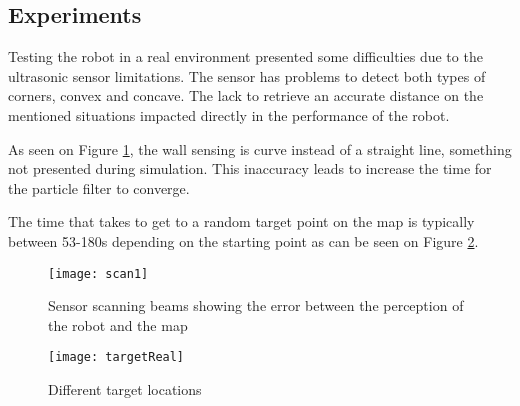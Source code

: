 \subsection{Experiments}

Testing the robot in a real environment presented some difficulties due to the  ultrasonic sensor limitations. The sensor has problems to detect both types of corners, convex and concave. The lack to retrieve an accurate distance on the mentioned situations impacted directly in the performance of the robot.

As seen on Figure \ref{fig:scan1}, the wall sensing is curve instead of a straight line, something not presented during simulation. This inaccuracy leads to increase the time for the particle filter to converge.
	
The time that takes to get to a random target point on the map is typically between 53-180s depending on the starting point as can be seen on Figure \ref{fig:targetReal}. 
	
		\begin{figure}[h]
			\centering
			\texttt{[image: scan1]}
			\caption{Sensor scanning beams showing the error between the perception of the robot and the map}
			\label{fig:scan1}
		\end{figure}

		\begin{figure}[h]
			\centering
			\texttt{[image: targetReal]}
			\caption{Different target locations}
			\label{fig:targetReal}
		\end{figure}	

\FloatBarrier